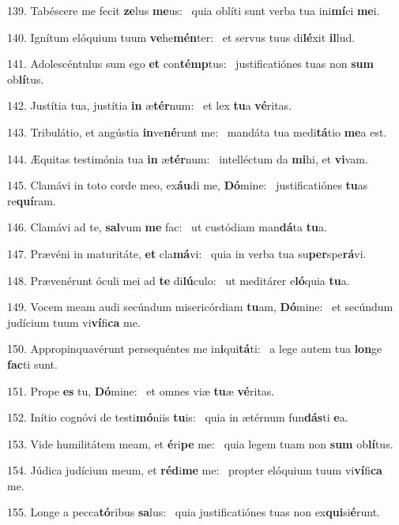 139. Tabéscere me fecit \textbf{ze}lus \textbf{me}us: \ast\  quia oblíti sunt verba tua ini\textbf{mí}ci \textbf{me}i.\

140. Ignítum elóquium tuum \textbf{ve}he\textbf{mén}ter: \ast\  et servus tuus di\textbf{lé}xit \textbf{il}lud.\

141. Adolescéntulus sum ego \textbf{et} con\textbf{témp}tus: \ast\  justificatiónes tuas non \textbf{sum} ob\textbf{lí}tus.\

142. Justítia tua, justítia \textbf{in} æ\textbf{tér}num: \ast\  et lex \textbf{tu}a \textbf{vé}ritas.\

143. Tribulátio, et angústia \textbf{in}ve\textbf{né}runt me: \ast\  mandáta tua medi\textbf{tá}tio \textbf{me}a est.\

144. Æquitas testimónia tua \textbf{in} æ\textbf{tér}num: \ast\  intelléctum da \textbf{mi}hi, et \textbf{vi}vam.\

145. Clamávi in toto corde meo, ex\textbf{áu}di me, \textbf{Dó}mine: \ast\  justificatiónes \textbf{tu}as re\textbf{quí}ram.\

146. Clamávi ad te, \textbf{sal}vum \textbf{me} fac: \ast\  ut custódiam man\textbf{dá}ta \textbf{tu}a.\

147. Prævéni in maturitáte, \textbf{et} cla\textbf{má}vi: \ast\  quia in verba tua su\textbf{per}spe\textbf{rá}vi.\

148. Prævenérunt óculi mei ad \textbf{te} di\textbf{lú}culo: \ast\  ut meditárer e\textbf{ló}quia \textbf{tu}a.\

149. Vocem meam audi secúndum misericórdiam \textbf{tu}am, \textbf{Dó}mine: \ast\  et secúndum judícium tuum vi\textbf{ví}fi\textbf{ca} me.\

150. Appropinquavérunt persequéntes me in\textbf{i}qui\textbf{tá}ti: \ast\  a lege autem tua \textbf{lon}ge \textbf{fac}ti sunt.\

151. Prope \textbf{es} tu, \textbf{Dó}mine: \ast\  et omnes viæ \textbf{tu}æ \textbf{vé}ritas.\

152. Inítio cognóvi de testi\textbf{mó}niis \textbf{tu}is: \ast\  quia in ætérnum fun\textbf{dás}ti \textbf{e}a.\

153. Vide humilitátem meam, et \textbf{é}ri\textbf{pe} me: \ast\  quia legem tuam non \textbf{sum} ob\textbf{lí}tus.\

154. Júdica judícium meum, et \textbf{réd}i\textbf{me} me: \ast\  propter elóquium tuum vi\textbf{ví}fi\textbf{ca} me.\

155. Longe a pecca\textbf{tó}ribus \textbf{sa}lus: \ast\  quia justificatiónes tuas non ex\textbf{qui}si\textbf{é}runt.\

